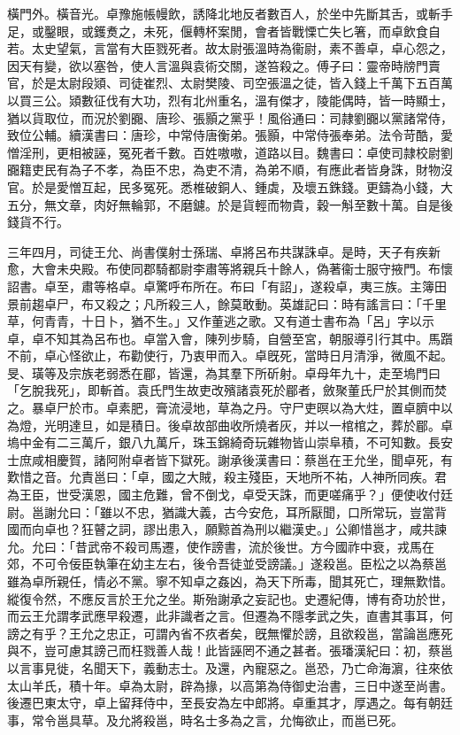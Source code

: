 \begin{pinyinscope}
橫門外。橫音光。卓豫施帳幔飲，誘降北地反者數百人，於坐中先斷其舌，或斬手足，或鑿眼，或鑊煑之，未死，偃轉杯案閒，會者皆戰慄亡失匕箸，而卓飲食自若。太史望氣，言當有大臣戮死者。故太尉張溫時為衞尉，素不善卓，卓心怨之，因天有變，欲以塞咎，使人言溫與袁術交關，遂笞殺之。傅子曰：靈帝時牓門賣官，於是太尉段熲、司徒崔烈、太尉樊陵、司空張溫之徒，皆入錢上千萬下五百萬以買三公。熲數征伐有大功，烈有北州重名，溫有傑才，陵能偶時，皆一時顯士，猶以貨取位，而況於劉嚻、唐珍、張顥之黨乎！風俗通曰：司隷劉嚻以黨諸常侍，致位公輔。續漢書曰：唐珍，中常侍唐衡弟。張顥，中常侍張奉弟。法令苛酷，愛憎淫刑，更相被誣，冤死者千數。百姓嗷嗷，道路以目。魏書曰：卓使司隷校尉劉嚻籍吏民有為子不孝，為臣不忠，為吏不清，為弟不順，有應此者皆身誅，財物沒官。於是愛憎互起，民多冤死。悉椎破銅人、鍾虡，及壞五銖錢。更鑄為小錢，大五分，無文章，肉好無輪郭，不磨鑢。於是貨輕而物貴，穀一斛至數十萬。自是後錢貨不行。

三年四月，司徒王允、尚書僕射士孫瑞、卓將呂布共謀誅卓。是時，天子有疾新愈，大會未央殿。布使同郡騎都尉李肅等將親兵十餘人，偽著衞士服守掖門。布懷詔書。卓至，肅等格卓。卓驚呼布所在。布曰「有詔」，遂殺卓，夷三族。主簿田景前趨卓尸，布又殺之；凡所殺三人，餘莫敢動。英雄記曰：時有謠言曰：「千里草，何青青，十日卜，猶不生。」又作董逃之歌。又有道士書布為「呂」字以示卓，卓不知其為呂布也。卓當入會，陳列步騎，自營至宮，朝服導引行其中。馬躓不前，卓心怪欲止，布勸使行，乃衷甲而入。卓旣死，當時日月清淨，微風不起。旻、璜等及宗族老弱悉在郿，皆還，為其羣下所斫射。卓母年九十，走至塢門曰「乞脫我死」，即斬首。袁氏門生故吏改殯諸袁死於郿者，斂聚董氏尸於其側而焚之。暴卓尸於市。卓素肥，膏流浸地，草為之丹。守尸吏暝以為大炷，置卓臍中以為燈，光明達旦，如是積日。後卓故部曲收所燒者灰，并以一棺棺之，葬於郿。卓塢中金有二三萬斤，銀八九萬斤，珠玉錦綺奇玩雜物皆山崇阜積，不可知數。長安士庶咸相慶賀，諸阿附卓者皆下獄死。謝承後漢書曰：蔡邕在王允坐，聞卓死，有歎惜之音。允責邕曰：「卓，國之大賊，殺主殘臣，天地所不祐，人神所同疾。君為王臣，世受漢恩，國主危難，曾不倒戈，卓受天誅，而更嗟痛乎？」便使收付廷尉。邕謝允曰：「雖以不忠，猶識大義，古今安危，耳所厭聞，口所常玩，豈當背國而向卓也？狂瞽之詞，謬出患入，願黥首為刑以繼漢史。」公卿惜邕才，咸共諫允。允曰：「昔武帝不殺司馬遷，使作謗書，流於後世。方今國祚中衰，戎馬在郊，不可令佞臣執筆在幼主左右，後令吾徒並受謗議。」遂殺邕。臣松之以為蔡邕雖為卓所親任，情必不黨。寧不知卓之姦凶，為天下所毒，聞其死亡，理無歎惜。縱復令然，不應反言於王允之坐。斯殆謝承之妄記也。史遷紀傳，博有奇功於世，而云王允謂孝武應早殺遷，此非識者之言。但遷為不隱孝武之失，直書其事耳，何謗之有乎？王允之忠正，可謂內省不疚者矣，旣無懼於謗，且欲殺邕，當論邕應死與不，豈可慮其謗己而枉戮善人哉！此皆誣罔不通之甚者。張璠漢紀曰：初，蔡邕以言事見徙，名聞天下，義動志士。及還，內寵惡之。邕恐，乃亡命海濵，往來依太山羊氏，積十年。卓為太尉，辟為掾，以高第為侍御史治書，三日中遂至尚書。後遷巴東太守，卓上留拜侍中，至長安為左中郎將。卓重其才，厚遇之。每有朝廷事，常令邕具草。及允將殺邕，時名士多為之言，允悔欲止，而邕已死。


\end{pinyinscope}
